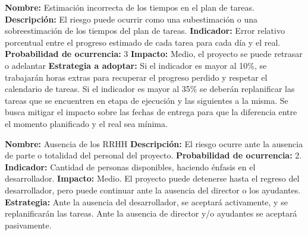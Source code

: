 \documentclass[a4paper, 10pt, oneside]{book}
\begin{document}
    \begin{flushleft}

        \textbf{Nombre:} Estimación incorrecta de los tiempos en el plan de tareas.\linebreak
        \textbf{Descripción:} El riesgo puede ocurrir como una subestimación o una sobreestimación de los tiempos del plan de tareas.\linebreak
        \textbf{Indicador:} Error relativo porcentual entre el progreso estimado de cada tarea para cada día y el real.\linebreak
        \textbf{Probabilidad de ocurrencia:} 3 \linebreak
        \textbf{Impacto:} Medio, el proyecto se puede retrasar o adelantar\linebreak
        \textbf{Estrategia a adoptar:} Si el indicador es mayor al 10\%, se trabajarán horas extras para recuperar el progreso perdido y respetar el calendario de tareas. \linebreak
        Si el indicador es mayor al 35\% se deberán replanificar las tareas que se encuentren en etapa de ejecución y las siguientes a la misma.\linebreak
        Se busca mitigar el impacto sobre las fechas de entrega para que la diferencia entre el momento planificado y el real sea mínima.\linebreak

        \textbf{Nombre:} Ausencia de los RRHH    \linebreak
        \textbf{Descripción:} El riesgo ocurre ante la ausencia de parte o totalidad del personal del proyecto.    \linebreak
        \textbf{Probabilidad de ocurrencia:} 2. \linebreak
        \textbf{Indicador:} Cantidad de personas disponibles, haciendo énfasis en el desarrollador.    \linebreak
        \textbf{Impacto:} Medio. El proyecto puede detenerse hasta el regreso del desarrollador, pero puede continuar ante la ausencia del director o los ayudantes. \linebreak
        \textbf{Estrategia:} Ante la ausencia del desarrollador, se aceptará activamente, y se replanificarán las tareas. Ante la ausencia de director y/o ayudantes se aceptará pasivamente.    \linebreak
    \end{flushleft}

    \mbox{}
    \nocite{*}
    
    
\end{document}
